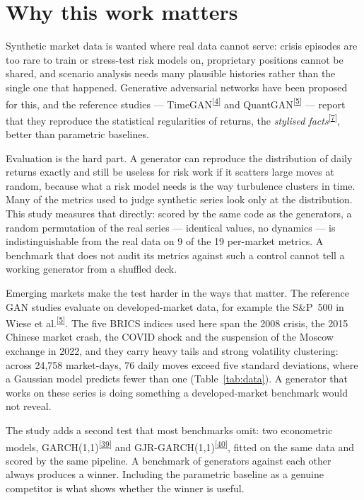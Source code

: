 \documentclass[11pt,a4paper]{article}
\makeatletter
\newcommand{\tcite}[1]{\textsuperscript{[\hyperlink{R:#1}{#1}]}}
\DeclareRobustCommand{\_}{\ifmmode\nfss@text{\textunderscore}\else\textunderscore\allowbreak\fi}
\makeatother
\begin{document}
\section{Why this work matters}
\label{sec:why}
Synthetic market data is wanted where real data cannot serve: crisis episodes are too rare to train or stress-test risk models on, proprietary positions cannot be shared, and scenario analysis needs many plausible histories rather than the single one that happened. Generative adversarial networks have been proposed for this, and the reference studies --- TimeGAN\tcite{4} and QuantGAN\tcite{5} --- report that they reproduce the statistical regularities of returns, the \emph{stylised facts}\tcite{7}, better than parametric baselines.

Evaluation is the hard part. A generator can reproduce the distribution of daily returns exactly and still be useless for risk work if it scatters large moves at random, because what a risk model needs is the way turbulence clusters in time. Many of the metrics used to judge synthetic series look only at the distribution. This study measures that directly: scored by the same code as the generators, a random permutation of the real series --- identical values, no dynamics --- is indistinguishable from the real data on 9 of the 19 per-market metrics. A benchmark that does not audit its metrics against such a control cannot tell a working generator from a shuffled deck.

Emerging markets make the test harder in the ways that matter. The reference GAN studies evaluate on developed-market data, for example the S\&P~500 in Wiese et al.\tcite{5}. The five BRICS indices used here span the 2008 crisis, the 2015 Chinese market crash, the COVID shock and the suspension of the Moscow exchange in 2022, and they carry heavy tails and strong volatility clustering: across 24,758 market-days, 76 daily moves exceed five standard deviations, where a Gaussian model predicts fewer than one (Table~\ref{tab:data}). A generator that works on these series is doing something a developed-market benchmark would not reveal.

The study adds a second test that most benchmarks omit: two econometric models, GARCH(1,1)\tcite{39} and GJR-GARCH(1,1)\tcite{40}, fitted on the same data and scored by the same pipeline. A benchmark of generators against each other always produces a winner. Including the parametric baseline as a genuine competitor is what shows whether the winner is useful.
\end{document}
